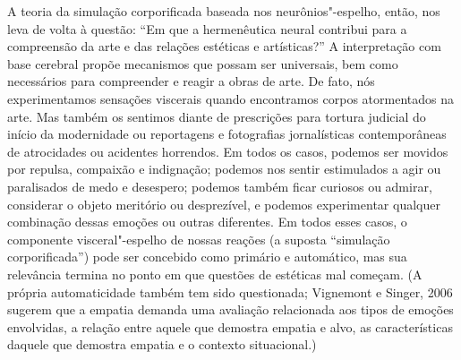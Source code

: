 A teoria da simulação corporificada baseada nos neurônios"-espelho,
então, nos leva de volta à questão: ``Em que a hermenêutica neural
contribui para a compreensão da arte e das relações estéticas e
artísticas?'' A interpretação com base cerebral propõe mecanismos que
possam ser universais, bem como necessários para compreender e reagir a
obras de arte. De fato, nós experimentamos sensações viscerais quando
encontramos corpos atormentados na arte. Mas também os sentimos diante
de prescrições para tortura judicial do início da modernidade ou
reportagens e fotografias jornalísticas contemporâneas de atrocidades ou
acidentes horrendos. Em todos os casos, podemos ser movidos por repulsa,
compaixão e indignação; podemos nos sentir estimulados a agir ou
paralisados de medo e desespero; podemos também ficar curiosos ou
admirar, considerar o objeto meritório ou desprezível, e podemos
experimentar qualquer combinação dessas emoções ou outras diferentes. Em
todos esses casos, o componente visceral"-espelho de nossas reações (a
suposta ``simulação corporificada'') pode ser concebido como primário e
automático, mas sua relevância termina no ponto em que questões de
estéticas mal começam. (A própria automaticidade também tem sido
questionada; Vignemont e Singer, 2006 sugerem que a empatia demanda uma
avaliação relacionada aos tipos de emoções envolvidas, a relação entre
aquele que demostra empatia e alvo, as características daquele que
demostra empatia e o contexto situacional.)

